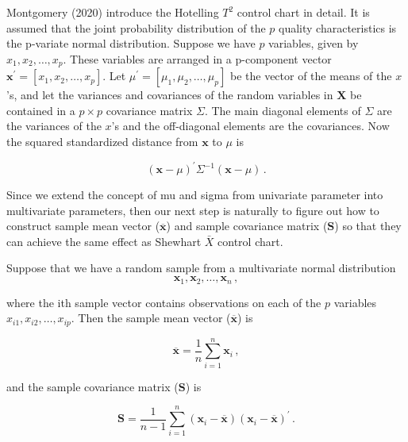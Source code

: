 Montgomery (2020) introduce the Hotelling $T^{2}$ control chart in detail. It is assumed that the joint probability distribution of the $p$ quality characteristics is the p-variate normal distribution. Suppose we have $p$ variables, given by $x_{1}, x_{2}, \ldots, x_{p}$. These variables are arranged in a p-component vector $\mathbf{x}^{\prime}=\left[x_{1}, x_{2}, \ldots, x_{p}\right]$. Let $\mu^{\prime}=\left[\mu_{1}, \mu_{2}, \ldots, \mu_{p}\right]$ be the vector of the means of the $x$'s, and let the variances and covariances of the random variables in $\mathbf{X}$ be contained in a $p × p$ covariance matrix $\Sigma$. The main diagonal elements of $\Sigma$ are the variances of the $x$’s and the off-diagonal elements are the covariances. Now the squared standardized distance from $\mathbf{x}$ to $\mu$ is

\begin{equation}
    (\mathbf{x}-\mu)^{\prime} \Sigma^{-1}(\mathbf{x}-\mu)\,.
    \label{equ:squared standardized (generalized) distance}
\end{equation}

Since we extend the concept of mu and sigma from univariate parameter into multivariate parameters, then our next step is naturally to figure out how to construct sample mean vector ($\overline{\mathbf{x}}$) and sample covariance matrix ($\mathbf{S}$) so that they can achieve the same effect as Shewhart $\bar{X}$ control chart.

Suppose that we have a random sample from a multivariate normal distribution
\begin{equation}
\mathbf{x}_{1}, \mathbf{x}_{2}, \ldots, \mathbf{x}_{n}\,,
\label{equ:x1_xn}
\end{equation}

where the ith sample vector contains observations on each of the $p$ variables 
$x_{i 1}, x_{i 2}, \ldots, x_{i p}$. Then the sample mean vector ($\overline{\mathbf{x}}$) is

\begin{equation}
\overline{\mathbf{x}}=\frac{1}{n} \sum_{i=1}^{n} \mathbf{x}_{i}\,,
\label{equ:x_mean}
\end{equation}

and the sample covariance matrix ($\mathbf{S}$) is

\begin{equation}
\mathbf{S}=\frac{1}{n-1} \sum_{i=1}^{n}\left(\mathbf{x}_{i}-\overline{\mathbf{x}}\right)\left(\mathbf{x}_{i}-\overline{\mathbf{x}}\right)^{\prime}\,.
\label{equ:S_x}
\end{equation}

